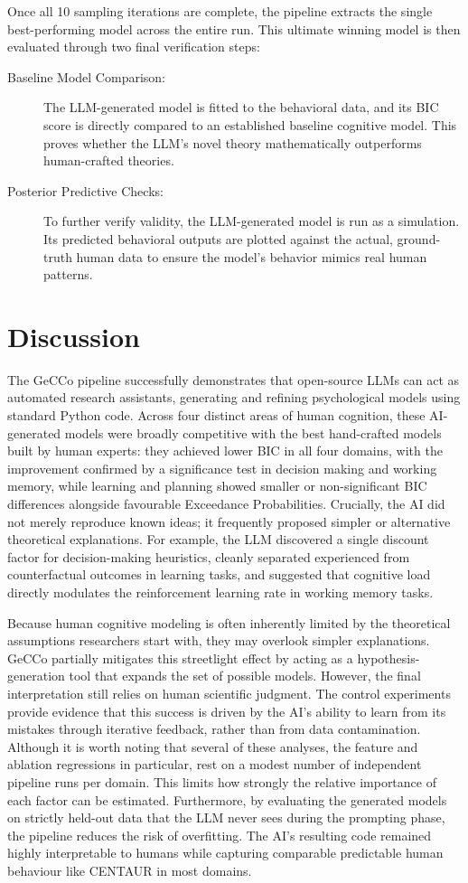 Once all 10 sampling iterations are complete, the pipeline extracts the single best-performing model across the entire run. This ultimate winning model is then evaluated through two final verification steps:

\begin{description}
    \item[Baseline Model Comparison:] The LLM-generated model is fitted to the behavioral data, and its BIC score is directly compared to an established baseline cognitive model. This proves whether the LLM's novel theory mathematically outperforms human-crafted theories.
    \item[Posterior Predictive Checks:] To further verify validity, the LLM-generated model is run as a simulation. Its predicted behavioral outputs are plotted against the actual, ground-truth human data to ensure the model's behavior mimics real human patterns.
\end{description}
\section{Discussion}
The GeCCo pipeline successfully demonstrates that open-source LLMs can act as automated research assistants, generating and refining psychological models using standard Python code. Across four distinct areas of human cognition, these AI-generated models were broadly competitive with the best hand-crafted models built by human experts: they achieved lower BIC in all four domains, with the improvement confirmed by a significance test in decision making and working memory, while learning and planning showed smaller or non-significant BIC differences alongside favourable Exceedance Probabilities. Crucially, the AI did not merely reproduce known ideas; it frequently proposed simpler or alternative theoretical explanations. For example, the LLM discovered a single discount factor for decision-making heuristics, cleanly separated experienced from counterfactual outcomes in learning tasks, and suggested that cognitive load directly modulates the reinforcement learning rate in working memory tasks. 

Because human cognitive modeling is often inherently limited by the theoretical assumptions researchers start with, they may overlook simpler explanations. GeCCo partially mitigates this streetlight effect by acting as a hypothesis-generation tool that expands the set of possible models. However, the final interpretation still relies on human scientific judgment. The control experiments provide evidence that this success is driven by the AI's ability to learn from its mistakes through iterative feedback, rather than from data contamination. Although it is worth noting that several of these analyses, the feature and ablation regressions in particular, rest on a modest number of independent pipeline runs per domain. This limits how strongly the relative importance of each factor can be estimated. Furthermore, by evaluating the generated models on strictly held-out data that the LLM never sees during the prompting phase, the pipeline reduces the risk of overfitting. The AI's resulting code remained highly interpretable to humans while capturing comparable predictable human behaviour like CENTAUR in most domains.

